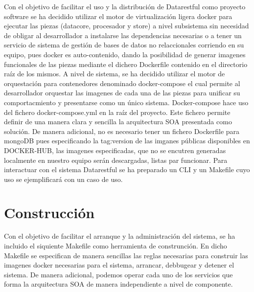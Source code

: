 \documentclass[a4paper,11pt]{book}
\begin{document}
Con el objetivo de facilitar el uso y la distribución de Datarestful como proyecto software se ha decidido utilizar el motor de virtualización ligera docker\cite{docker} para ejecutar las piezas (datacore, procesador y store) a nivel subsistema sin necesidad de obligar al desarrollador a instalarse las dependencias necesarias o a tener un servicio de sistema de gestión de bases de datos no relaccionales corriendo en su equipo, pues docker es auto-contenido, dando la posibilidad de generar imagenes funcionales de las piezas mediante el dichero Dockerfile contenido en el directorio raíz de los mismos. A nivel de sistema, se ha decidido utilizar el motor de orquestación para contenedores denominado docker-compose el cual permite al desarrollador orquestar las imagenes de cada una de las piezas para unificar su comportacmiento y presentarse como un único sistema. Docker-compose hace uso del fichero docker-compose.yml en la raíz del proyecto. Este fichero permite definir de una manera clara y sencilla la arquitectura SOA presentada como solución. De manera adicional, no es necesario tener un fichero Dockerfile para mongoDB pues especificando la tag:version de las imganes públicas disponibles en DOCKER-HUB, las imagenes especificadas, que no se encutren generadas localmente en nuestro equipo serán descargadas, listas par funcionar. Para interactuar con el sistema Datarestful se ha preparado un CLI y un Makefile cuyo uso se ejemplificará con un caso de uso. 

\section{ Construcción }

Con el objetivo de facilitar el arranque y la administración del sistema, se ha incluido el siquiente Makefile como herramienta de construnción. En dicho Makefile se especifican de manera sencillas las reglas necesarias para construir las imagenes docker necesarias para el sistema, arrancar, debbugear y detener el sistema. De manera adicional, podemos operar cada uno de los servicios que forma la arquitectura SOA de manera independiente a nivel de componente. 
\end{document}
